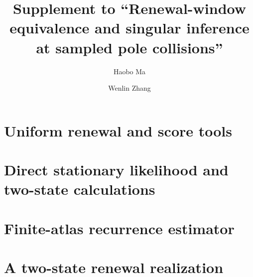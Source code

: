\documentclass[12pt]{article}
\title{Supplement to ``Renewal-window equivalence and singular inference at sampled pole collisions''}
\author{Haobo Ma \and Wenlin Zhang}
\date{}
\begin{document}
\maketitle
\tableofcontents

\section{Uniform renewal and score tools}


\section{Direct stationary likelihood and two-state calculations}


\section{Finite-atlas recurrence estimator}


\section{A two-state renewal realization}

\end{document}
